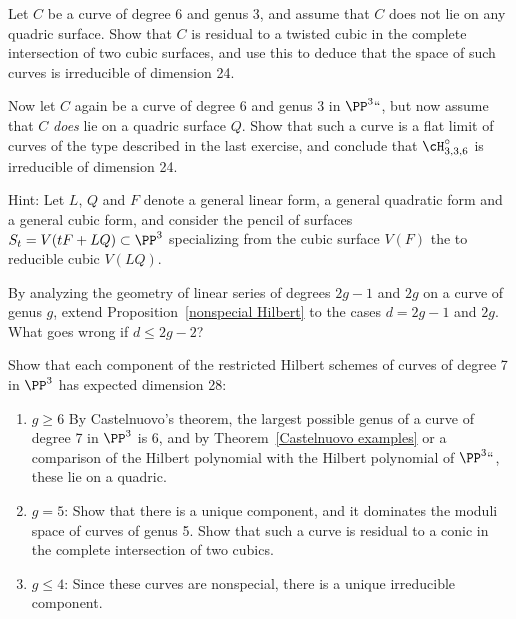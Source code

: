 \begin{exercise}\label{6,3:1}
Let $C$ be a curve of degree 6 and genus 3, and assume that $C$ does
not lie on any quadric surface. Show that $C$ is residual to a twisted
cubic in the complete intersection of two cubic surfaces, and use this
to deduce that the space of such curves is irreducible of dimension 24.
\end{exercise}


\begin{exercise}\label{6,3:2}
Now let $C$ again be a curve of degree 6 and genus 3 in $\PP^3` `$, but
now assume that $C$ \emph{does} lie on a quadric surface $Q$. Show that
such a curve is a flat limit of curves of the type described in the
last exercise, and conclude that $\cH^\circ_{3,3,6}$ is irreducible of
dimension 24.

Hint: Let $L$, $Q$ and $F$ denote a general linear form,
a general quadratic form and a general cubic form, and consider the
pencil of surfaces $S_t = V(tF + LQ) \subset \PP^3$ specializing from
the cubic surface $V(F)$ the to reducible cubic $V(LQ)$.
\end{exercise}

\begin{exercise}
By analyzing the geometry of linear series of degrees $2g-1$ and $2g$
on a curve of genus $g$, extend Proposition~\ref{nonspecial Hilbert}
to the cases $d = 2g-1$ and $2g$. What goes wrong if $d \leq 2g-2$?
\end{exercise}

\begin{exercise}\label{degree 7 analysis}
Show that each component of the restricted Hilbert schemes of curves of
degree 7
in $\PP^3$ has expected dimension 28:
\begin{enumerate}
 \item $g\geq 6$
By Castelnuovo's theorem, the largest possible genus of a curve of degree
7 in $\PP^3$ is 6, and
by Theorem~\ref{Castelnuovo examples} or a comparison of the Hilbert
polynomial
with the Hilbert polynomial of $\PP^3` `$, these lie on a quadric.
 \item $g=5$: Show that there is a unique component, and it dominates
 the moduli space of curves of genus 5.
 Show that such a  curve is residual to a conic in the complete
 intersection of two cubics.
 \item $g\leq 4$: Since these curves are nonspecial,  there is a unique
 irreducible component.
\end{enumerate}
\end{exercise}


